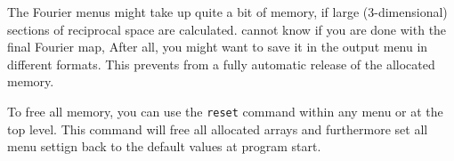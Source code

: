 The Fourier menus might take up quite a bit of memory, if large
(3-dimensional) sections of reciprocal space are calculated. 
\Discus cannot know if you are done with the final Fourier 
map, After all, you might want to save it in the output menu 
in different formats. This prevents \Discus from a fully 
automatic release of the allocated memory. 

To free all memory, you can use the {\tt reset} command within
any menu or at the \Discus top level. This command will 
free all allocated arrays and furthermore set all menu 
settign back to the default values at program start. 


